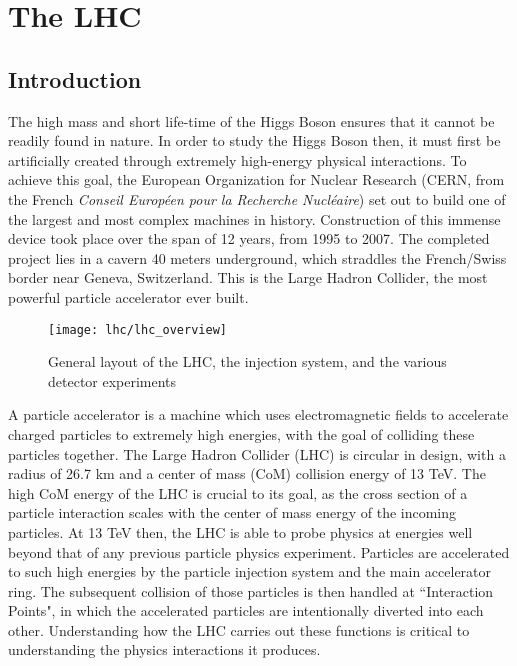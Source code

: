 \chapter{The LHC}\label{chapter:lhc}

\section{Introduction}
    The high mass and short life-time of the Higgs Boson ensures that it cannot be readily found in nature.
    In order to study the Higgs Boson then, it must first be artificially created through extremely high-energy physical interactions.
    To achieve this goal, the European Organization for Nuclear Research
        (CERN, from the French \textit{Conseil Européen pour la Recherche Nucléaire})
        set out to build one of the largest and most complex machines in history.
    Construction of this immense device took place over the span of 12 years, from 1995 to 2007.
    The completed project lies in a cavern 40 meters underground, which straddles the French/Swiss border near Geneva, Switzerland.
    This is the Large Hadron Collider, the most powerful particle accelerator ever built.

    \begin{figure}[h]
        \texttt{[image: lhc/lhc\_overview]}
        \caption{General layout of the LHC, the injection system, and the various detector experiments \cite{lhc_run2}}
        \label{fig:lhc_overview}
    \end{figure}

    A particle accelerator is a machine which uses electromagnetic fields to accelerate charged particles to extremely high energies, with the goal of colliding these particles together.
    The Large Hadron Collider (LHC) is circular in design, with a radius of 26.7 km and a center of mass (CoM) collision energy of 13 TeV.
    The high CoM energy of the LHC is crucial to its goal, as the cross section of a particle interaction scales with the center of mass energy of the incoming particles.
    At 13 TeV then, the LHC is able to probe physics at energies well beyond that of any previous particle physics experiment.
    Particles are accelerated to such high energies by the particle injection system and the main accelerator ring.
    The subsequent collision of those particles is then handled at ``Interaction Points", in which the accelerated particles are intentionally diverted into each other.
    Understanding how the LHC carries out these functions is critical to understanding the physics interactions it produces.


